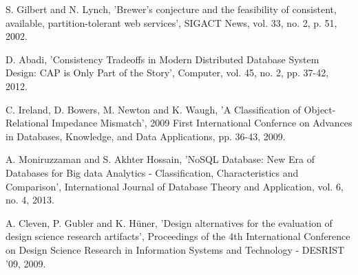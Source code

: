 \begin{thebibliography}{69}



 S.  Gilbert and N.  Lynch, 'Brewer's conjecture and the feasibility of consistent, available, partition-tolerant web services', SIGACT News, vol. 33, no. 2, p. 51, 2002.

 D.  Abadi, 'Consistency Tradeoffs in Modern Distributed Database System Design: CAP is Only Part of the Story', Computer, vol. 45, no. 2, pp. 37-42, 2012.



 C.  Ireland, D.  Bowers, M.  Newton and K.  Waugh, 'A Classification of Object-Relational Impedance Mismatch', 2009 First International Confernce on Advances in Databases, Knowledge, and Data Applications, pp. 36-43, 2009.


 A. Moniruzzaman and S. Akhter Hossain, 'NoSQL Database: New Era of Databases for Big data Analytics - Classification, Characteristics and Comparison', International Journal of Database Theory and Application, vol. 6, no. 4, 2013.

 A.  Cleven, P.  Gubler and K.  Hüner, 'Design alternatives for the evaluation of design science research artifacts', Proceedings of the 4th International Conference on Design Science Research in Information Systems and Technology - DESRIST '09, 2009.


\end{thebibliography}
